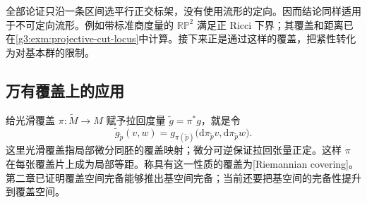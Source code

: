 \ProseParagraphBreak

全部论证只沿一条区间选平行正交标架，没有使用流形的定向。因而结论同样适用于不可定向流形。例如带标准商度量的 \(\mathbb{RP}^2\) 满足正 Ricci 下界；其覆盖和距离已在\cref{g3:exm:projective-cut-locus}中计算。接下来正是通过这样的覆盖，把紧性转化为对基本群的限制。

\subsection{万有覆盖上的应用}
\label{g3:subsec:0801:03}

给光滑覆盖 \(\pi:\widetilde M\to M\) 赋予拉回度量 \(\widetilde g=\pi^*g\)，就是令
\[
	\widetilde g_{\widetilde p}(v,w)
	=g_{\pi(\widetilde p)}\bigl(\mathrm{d}\pi_{\widetilde p}v,
	\mathrm{d}\pi_{\widetilde p}w\bigr).
\]
这里光滑覆盖指局部微分同胚的覆盖映射；微分可逆保证拉回张量正定。这样 \(\pi\) 在每张覆盖片上成为局部等距。称具有这一性质的覆盖为[Riemannian covering]。第二章已证明覆盖空间完备能够推出基空间完备；当前还要把基空间的完备性提升到覆盖空间。

